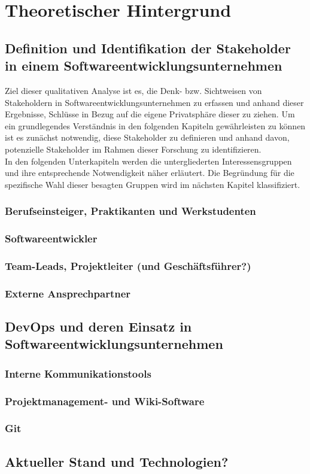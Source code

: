 \chapter{Theoretischer Hintergrund} %
\label{Background} %

\section{Definition und Identifikation der Stakeholder in einem Softwareentwicklungsunternehmen}
Ziel dieser qualitativen Analyse ist es, die Denk- bzw. Sichtweisen von Stakeholdern in Softwareentwicklungsunternehmen zu erfassen und anhand dieser Ergebnisse, Schlüsse in Bezug auf die
eigene Privatsphäre dieser zu ziehen. Um ein grundlegendes Verständnis in den folgenden Kapiteln gewährleisten zu können ist es zunächst notwendig, diese Stakeholder zu definieren und anhand davon, 
potenzielle Stakeholder im Rahmen dieser Forschung zu identifizieren. \\
In den folgenden Unterkapiteln werden die untergliederten Interessensgruppen und ihre entsprechende Notwendigkeit näher erläutert. Die Begründung für die spezifische Wahl dieser besagten Gruppen wird im
nächsten Kapitel klassifiziert.


\subsection{Berufseinsteiger, Praktikanten und Werkstudenten}

\subsection{Softwareentwickler}

\subsection{Team-Leads, Projektleiter (und Geschäftsführer?)}

\subsection{Externe Ansprechpartner}

\section{DevOps und deren Einsatz in Softwareentwicklungsunternehmen}

\subsection{Interne Kommunikationstools}

\subsection{Projektmanagement- und Wiki-Software}

\subsection{Git}

\section{Aktueller Stand und Technologien?}